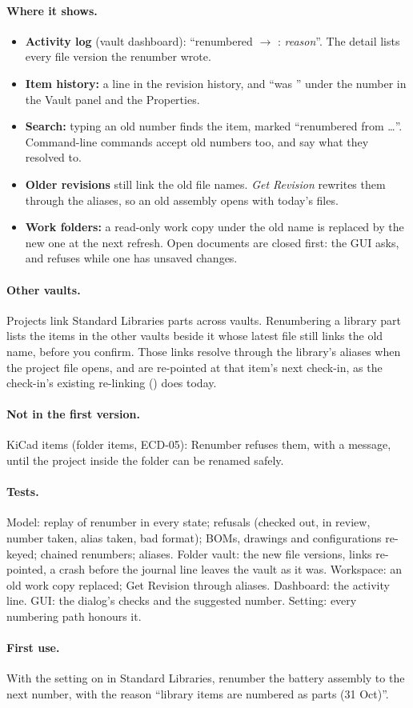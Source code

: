 \paragraph{Where it shows.}
\begin{itemize}[nosep]
  \item \textbf{Activity log} (vault dashboard): ``renumbered  $\to$
        : \textit{reason}''. The detail lists every file version the renumber wrote.
  \item \textbf{Item history:} a line in the revision history, and ``was '' under the
        number in the Vault panel and the Properties.
  \item \textbf{Search:} typing an old number finds the item, marked ``renumbered from \ldots''. Command-line
        commands accept old numbers too, and say what they resolved to.
  \item \textbf{Older revisions} still link the old file names. \emph{Get Revision} rewrites them through the
        aliases, so an old assembly opens with today's files.
  \item \textbf{Work folders:} a read-only work copy under the old name is replaced by the new one at the next
        refresh. Open documents are closed first: the GUI asks, and refuses while one has unsaved changes.
\end{itemize}

\paragraph{Other vaults.} Projects link Standard Libraries parts across vaults. Renumbering a library part lists
the items in the other vaults beside it whose latest file still links the old name, before you confirm. Those links
resolve through the library's aliases when the project file opens, and are re-pointed at that item's next
check-in, as the check-in's existing re-linking () does today.

\paragraph{Not in the first version.} KiCad items (folder items, ECD-05): Renumber refuses them, with a message,
until the project inside the folder can be renamed safely.

\paragraph{Tests.} Model: replay of renumber in every state; refusals (checked out, in review, number taken, alias
taken, bad format); BOMs, drawings and configurations re-keyed; chained renumbers; aliases. Folder vault: the new
file versions, links re-pointed, a crash before the journal line leaves the vault as it was. Workspace: an old work
copy replaced; Get Revision through aliases. Dashboard: the activity line. GUI: the dialog's checks and the
suggested number. Setting: every numbering path honours it.

\paragraph{First use.} With the setting on in Standard Libraries, renumber the battery assembly
 to the next  number, with the reason ``library items are numbered as parts
(31 Oct)''.

